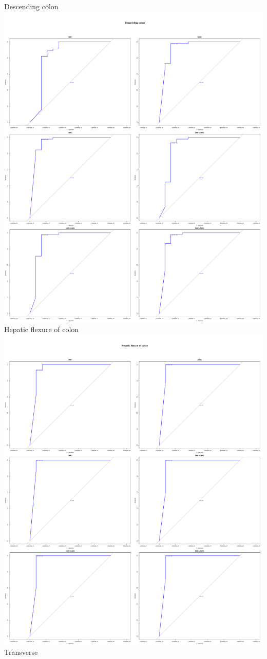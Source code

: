 \documentclass[openany]{book}
\begin{document}
Descending colon\includegraphics{book1_files/figure-latex/plots-7.pdf}
Hepatic flexure of
colon\includegraphics{book1_files/figure-latex/plots-8.pdf} Transverse
\end{document}
